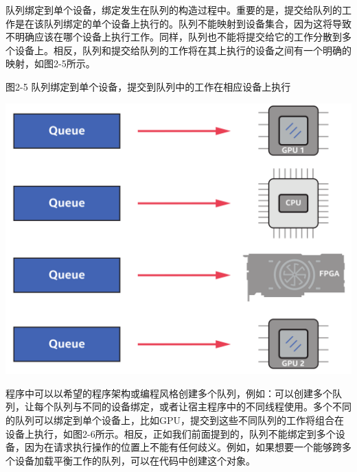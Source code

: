 队列绑定到单个设备，绑定发生在队列的构造过程中。重要的是，提交给队列的工作是在该队列绑定的单个设备上执行的。队列不能映射到设备集合，因为这将导致不明确应该在哪个设备上执行工作。同样，队列也不能将提交给它的工作分散到多个设备上。相反，队列和提交给队列的工作将在其上执行的设备之间有一个明确的映射，如图2-5所示。\par

\hspace*{\fill} \par %
图2-5 队列绑定到单个设备，提交到队列中的工作在相应设备上执行
\begin{center}
	\includegraphics[width=1.\textwidth]{content/chapter-2/images/4}
\end{center}

程序中可以以希望的程序架构或编程风格创建多个队列，例如：可以创建多个队列，让每个队列与不同的设备绑定，或者让宿主程序中的不同线程使用。多个不同的队列可以绑定到单个设备上，比如GPU，提交到这些不同队列的工作将组合在设备上执行，如图2-6所示。相反，正如我们前面提到的，队列不能绑定到多个设备，因为在请求执行操作的位置上不能有任何歧义。例如，如果想要一个能够跨多个设备加载平衡工作的队列，可以在代码中创建这个对象。\par

